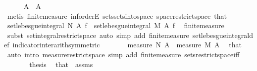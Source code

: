 \begin{isabellebody}
\ \ \ \ \isamarkupfalse%
\ {\isachardoublequoteopen}A\ {\isacharequal}{\kern0pt}\ A\ {\isasyminter}\ {\isasymOmega}{\isachardoublequoteclose}\ \isamarkupfalse%
\ {\isacharparenleft}{\kern0pt}metis\ finite{\isacharunderscore}{\kern0pt}measure{\isacharparenleft}{\kern0pt}{}{\isacharcomma}{\kern0pt}{}{\isacharparenright}{\kern0pt}\ inf{\isachardot}{\kern0pt}orderE\ sets{\isachardot}{\kern0pt}sets{\isacharunderscore}{\kern0pt}into{\isacharunderscore}{\kern0pt}space\ space{\isacharunderscore}{\kern0pt}restrict{\isacharunderscore}{\kern0pt}space\ that{\isacharparenleft}{\kern0pt}{}{\isacharparenright}{\kern0pt}{\isacharparenright}{\kern0pt}\isanewline
\ \ \ \ \isamarkupfalse%
\ {\isachardoublequoteopen}set{\isacharunderscore}{\kern0pt}lebesgue{\isacharunderscore}{\kern0pt}integral\ N\ A\ f\ {\isacharequal}{\kern0pt}\ set{\isacharunderscore}{\kern0pt}lebesgue{\isacharunderscore}{\kern0pt}integral\ M\ A\ f{\isachardoublequoteclose}\ \isamarkupfalse%
\ finite{\isacharunderscore}{\kern0pt}measure\ \isamarkupfalse%
\ {\isacharparenleft}{\kern0pt}subst\ set{\isacharunderscore}{\kern0pt}integral{\isacharunderscore}{\kern0pt}restrict{\isacharunderscore}{\kern0pt}space{\isacharcomma}{\kern0pt}\ auto\ simp\ add{\isacharcolon}{\kern0pt}\ finite{\isacharunderscore}{\kern0pt}measure\ set{\isacharunderscore}{\kern0pt}lebesgue{\isacharunderscore}{\kern0pt}integral{\isacharunderscore}{\kern0pt}def\ indicator{\isacharunderscore}{\kern0pt}inter{\isacharunderscore}{\kern0pt}arith{\isacharbrackleft}{\kern0pt}symmetric{\isacharbrackright}{\kern0pt}{\isacharparenright}{\kern0pt}\isanewline
\ \ \ \ \isamarkupfalse%
\ \isamarkupfalse%
\ {\isachardoublequoteopen}measure\ N\ A\ {\isacharequal}{\kern0pt}\ measure\ M\ A{\isachardoublequoteclose}\ \isamarkupfalse%
\ that\ \isamarkupfalse%
\ {\isacharparenleft}{\kern0pt}auto\ intro{\isacharbang}{\kern0pt}{\isacharcolon}{\kern0pt}\ measure{\isacharunderscore}{\kern0pt}restrict{\isacharunderscore}{\kern0pt}space\ simp\ add{\isacharcolon}{\kern0pt}\ finite{\isacharunderscore}{\kern0pt}measure\ sets{\isacharunderscore}{\kern0pt}restrict{\isacharunderscore}{\kern0pt}space{\isacharunderscore}{\kern0pt}iff{\isacharparenright}{\kern0pt}\isanewline
\ \ \ \ \isamarkupfalse%
\ \isamarkupfalse%
\ {\isacharquery}{\kern0pt}thesis\ \isamarkupfalse%
\ that\ {\isacharasterisk}{\kern0pt}\ assms{\isacharparenleft}{\kern0pt}{}{\isacharparenright}{\kern0pt}\ \isamarkupfalse%

\end{isabellebody}
